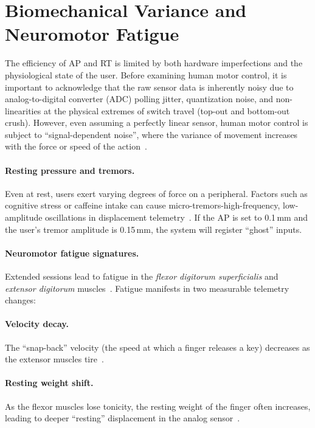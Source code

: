 \section{Biomechanical Variance and Neuromotor Fatigue}

The efficiency of AP and RT is limited by both hardware imperfections and the physiological state of the user. Before examining human motor control, it is important to acknowledge that the raw sensor data is inherently noisy due to analog-to-digital converter (ADC) polling jitter, quantization noise, and non-linearities at the physical extremes of switch travel (top-out and bottom-out crush). However, even assuming a perfectly linear sensor, human motor control is subject to \enquote{signal-dependent noise}, where the variance of movement increases with the force or speed of the action~\cite{harris_wolpert_1998}.

\paragraph{Resting pressure and tremors.}
Even at rest, users exert varying degrees of force on a peripheral. Factors such as cognitive stress or caffeine intake can cause micro-tremors-high-frequency, low-amplitude oscillations in displacement telemetry~\cite{stress_pressure}. If the AP is set to 0.1\,mm and the user's tremor amplitude is 0.15\,mm, the system will register \enquote{ghost} inputs.

\paragraph{Neuromotor fatigue signatures.}
Extended sessions lead to fatigue in the \textit{flexor digitorum superficialis} and \textit{extensor digitorum} muscles~\cite{fatigue_flexor, clicking_fatigue_ergonomics_2024}. Fatigue manifests in two measurable telemetry changes:

\paragraph{Velocity decay.} The \enquote{snap-back} velocity (the speed at which a finger releases a key) decreases as the extensor muscles tire~\cite{wrist_fatigue_genre_2025}.

\paragraph{Resting weight shift.} As the flexor muscles lose tonicity, the resting weight of the finger often increases, leading to deeper \enquote{resting} displacement in the analog sensor~\cite{heimhofer2024finger, 1hp_esports_ergonomics}.

